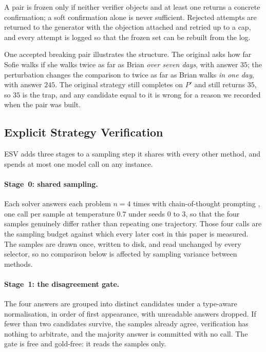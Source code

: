 A pair is frozen only if neither verifier objects and at least one returns a
concrete confirmation; a soft confirmation alone is never sufficient. Rejected
attempts are returned to the generator with the objection attached and retried
up to a cap, and every attempt is logged so that the frozen set can be rebuilt
from the log.

One accepted breaking pair illustrates the structure. The original asks how far
Sofie walks if she walks twice as far as Brian \emph{over seven days}, with
answer $35$; the perturbation changes the comparison to twice as far as Brian
walks \emph{in one day}, with answer $245$. The original strategy still
completes on $P'$ and still returns $35$, so $35$ is the trap, and any candidate
equal to it is wrong for a reason we recorded when the pair was built.

\subsection{Explicit Strategy Verification}
\label{sec:esv}

ESV adds three stages to a sampling step it shares with every other method, and
spends at most one model call on any instance.

\paragraph{Stage~0: shared sampling.}
Each solver answers each problem $n = 4$ times with chain-of-thought prompting
\cite{wei2022chain}, one call per sample at temperature $0.7$ under seeds $0$
to $3$, so that the four samples genuinely differ rather than repeating one
trajectory. Those four calls are the sampling budget against which every
later cost in this paper is measured. The samples are drawn once, written to
disk, and read unchanged by every selector, so no comparison below is affected
by sampling variance between methods.

\paragraph{Stage~1: the disagreement gate.}
\label{sec:gate}
The four answers are grouped into distinct candidates under a type-aware
normalisation, in order of first appearance, with unreadable answers dropped.
If fewer than two candidates survive, the samples already agree, verification
has nothing to arbitrate, and the majority answer is committed with no call.
The gate is free and gold-free: it reads the samples only.

